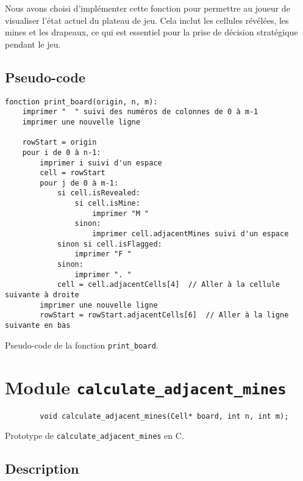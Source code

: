 Nous avons choisi d'implémenter cette fonction pour permettre au joueur de visualiser l'état actuel du plateau de jeu. 
Cela inclut les cellules révélées, les mines et les drapeaux, ce qui est essentiel pour la prise de décision stratégique pendant le jeu.

\subsection{Pseudo-code}

\begin{longlisting}
    \begin{verbatim}
fonction print_board(origin, n, m):
    imprimer "  " suivi des numéros de colonnes de 0 à m-1
    imprimer une nouvelle ligne

    rowStart = origin
    pour i de 0 à n-1:
        imprimer i suivi d'un espace
        cell = rowStart
        pour j de 0 à m-1:
            si cell.isRevealed:
                si cell.isMine:
                    imprimer "M "
                sinon:
                    imprimer cell.adjacentMines suivi d'un espace
            sinon si cell.isFlagged:
                imprimer "F "
            sinon:
                imprimer ". "
            cell = cell.adjacentCells[4]  // Aller à la cellule suivante à droite
        imprimer une nouvelle ligne
        rowStart = rowStart.adjacentCells[6]  // Aller à la ligne suivante en bas
    \end{verbatim}
    \caption{Pseudo-code de la fonction \texttt{print\_board}.}
\end{longlisting}

\section{Module \texttt{calculate\_adjacent\_mines}}


\begin{listing}[!htpb]
    \begin{verbatim}
        void calculate_adjacent_mines(Cell* board, int n, int m);
    \end{verbatim}
    \caption{Prototype de \texttt{calculate\_adjacent\_mines} en C.}
    \label{listing:c-calculate_adjacent_mines-prototype}
\end{listing}

\subsection{Description}

